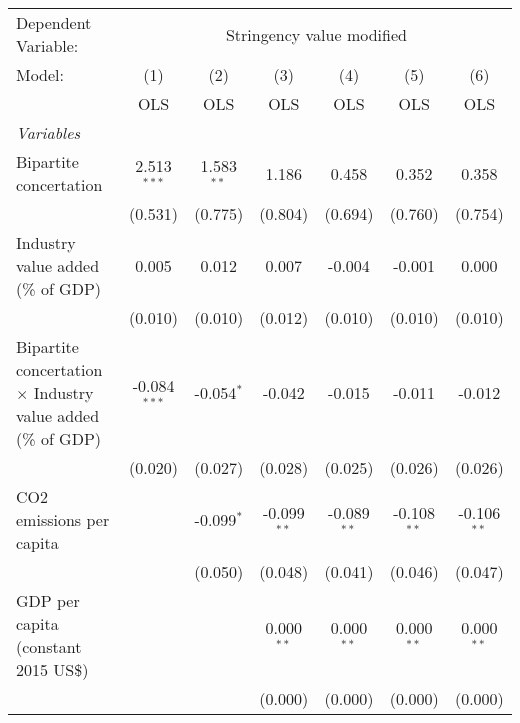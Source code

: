 
\begingroup
\centering
\begin{tabular}{lcccccc}
   \toprule
   Dependent Variable: & \multicolumn{6}{c}{Stringency value modified}\\
   Model:                                                             & (1)            & (2)          & (3)           & (4)            & (5)            & (6)\\  
                                                                      &  OLS           & OLS          & OLS           & OLS            & OLS            & OLS\\  
   \midrule
   \emph{Variables}\\
   Bipartite concertation                                             & 2.513$^{***}$  & 1.583$^{**}$ & 1.186         & 0.458          & 0.352          & 0.358\\   
                                                                      & (0.531)        & (0.775)      & (0.804)       & (0.694)        & (0.760)        & (0.754)\\   
   Industry value added (\% of GDP)                                   & 0.005          & 0.012        & 0.007         & -0.004         & -0.001         & 0.000\\   
                                                                      & (0.010)        & (0.010)      & (0.012)       & (0.010)        & (0.010)        & (0.010)\\   
   Bipartite concertation $\times$ Industry value added (\% of GDP)   & -0.084$^{***}$ & -0.054$^{*}$ & -0.042        & -0.015         & -0.011         & -0.012\\   
                                                                      & (0.020)        & (0.027)      & (0.028)       & (0.025)        & (0.026)        & (0.026)\\   
   CO2 emissions per capita                                           &                & -0.099$^{*}$ & -0.099$^{**}$ & -0.089$^{**}$  & -0.108$^{**}$  & -0.106$^{**}$\\   
                                                                      &                & (0.050)      & (0.048)       & (0.041)        & (0.046)        & (0.047)\\   
   GDP per capita (constant 2015 US\$)                                &                &              & 0.000$^{**}$  & 0.000$^{**}$   & 0.000$^{**}$   & 0.000$^{**}$\\   
                                                                      &                &              & (0.000)       & (0.000)        & (0.000)        & (0.000)\\   

\end{tabular}
